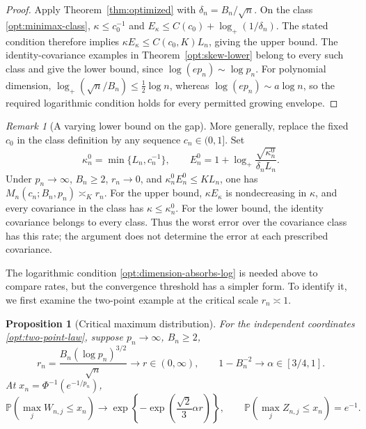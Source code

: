 \documentclass[11pt,a4paper]{article}
\newtheorem{proposition}{Proposition}
\theoremstyle{remark}
\newtheorem{remark}{Remark}
\newcommand{\Pp}{\mathbb P}
\begin{document}
\begin{proof}
Apply Theorem~\ref{thm:optimized} with \(\delta_n=B_n/\sqrt n\).
On the class \eqref{opt:minimax-class}, \(\kappa\le c_0^{-1}\) and
\(E_\kappa\le C(c_0)+\log_+(1/\delta_n)\). The stated condition
therefore implies \(\kappa E_\kappa\le C(c_0,K)L_n\), giving the upper
bound. The identity-covariance examples in
Theorem~\ref{opt:skew-lower} belong to every such class and give the
lower bound, since \(\log(ep_n)\sim\log p_n\). For polynomial dimension,
\(\log_+(\sqrt n/B_n)\le\tfrac12\log n\), whereas
\(\log(ep_n)\sim a\log n\), so the required logarithmic condition holds
for every permitted growing envelope.
\end{proof}

\begin{remark}[A varying lower bound on the gap]
\label{opt:varying-gap-class}
More generally, replace the fixed \(c_0\) in the class definition by
any sequence \(c_n\in(0,1]\). Set
\[
 \kappa_n^0=\min\{L_n,c_n^{-1}\},\qquad
 E_n^0=1+\log_+\frac{\sqrt{\kappa_n^0}}{\delta_nL_n}.
\]
Under \(p_n\to\infty\), \(B_n\ge2\), \(r_n\to0\), and
\(\kappa_n^0E_n^0\le K L_n\), one has
\(M_n(c_n;B_n,p_n)\asymp_K r_n\). For the upper bound,
\(\kappa E_\kappa\) is nondecreasing in \(\kappa\), and every covariance
in the class has \(\kappa\le\kappa_n^0\). For the lower bound, the
identity covariance belongs to every class. Thus the worst error over
the covariance class has this rate; the argument does not determine the error at each prescribed covariance.
\end{remark}

The logarithmic condition \eqref{opt:dimension-absorbs-log} is needed
above to compare rates, but the convergence threshold has a simpler
form. To identify it, we first examine the two-point example at the
critical scale \(r_n\asymp1\).

\begin{proposition}[Critical maximum distribution]
\label{opt:critical}
For the independent coordinates \eqref{opt:two-point-law}, suppose
\(p_n\to\infty\), \(B_n\ge2\),
\[
 r_n=\frac{B_n(\log p_n)^{3/2}}{\sqrt n}\longrightarrow r\in(0,\infty),
 \qquad 1-B_n^{-2}\longrightarrow\alpha\in[3/4,1].
\]
At \(x_n=\Phi^{-1}(e^{-1/p_n})\),
\begin{equation}
 \Pp(\max_jW_{n,j}\le x_n)
 \longrightarrow
 \exp\!\left\{-\exp\!\left(\frac{\sqrt2}{3}\alpha r\right)\right\},
 \qquad \Pp(\max_jZ_{n,j}\le x_n)=e^{-1}.
 \label{opt:critical-maxcdf}
\end{equation}
\end{proposition}
\end{document}
